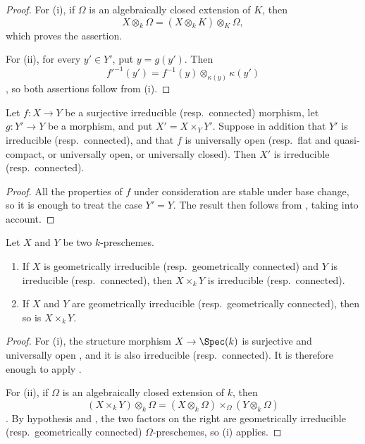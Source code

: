 \begin{proof}
For (i), if $\Omega$ is an algebraically closed extension of $K$, then
\[
X\otimes_k\Omega
  =(X\otimes_k K)\otimes_K\Omega,
\]
which proves the assertion.

For (ii), for every $y'\in Y'$, put $y=g(y')$.
Then
\[
f'^{-1}(y')
  =f^{-1}(y)\otimes_{\kappa(y)}\kappa(y')
\]
, so both assertions follow from (i).
\end{proof}

\begin{proposition}[4.5.7]
\label{IV.4.5.7}
Let $f:X\to Y$ be a surjective irreducible (resp.\ connected)
morphism, let $g:Y'\to Y$ be a morphism, and put
$X'=X\times_Y Y'$.
Suppose in addition that $Y'$ is irreducible (resp.\ connected), and
that $f$ is universally open (resp.\ flat and quasi-compact, or
universally open, or universally closed).
Then $X'$ is irreducible (resp.\ connected).
\end{proposition}

\begin{proof}
All the properties of $f$ under consideration are stable under base
change, so it is enough to treat the case $Y'=Y$.
The result then follows from , taking
 into account.
\end{proof}

\begin{corollary}[4.5.8]
\label{IV.4.5.8}
Let $X$ and $Y$ be two $k$-preschemes.
\begin{enumerate}
\item[\rm(i)]
\label{IV.4.5.8.i}
If $X$ is geometrically irreducible (resp.\ geometrically connected)
and $Y$ is irreducible (resp.\ connected), then $X\times_k Y$ is
irreducible (resp.\ connected).

\item[\rm(ii)]
\label{IV.4.5.8.ii}
If $X$ and $Y$ are geometrically irreducible
(resp.\ geometrically connected), then so is $X\times_k Y$.
\end{enumerate}
\end{corollary}

\begin{proof}
For (i), the structure morphism
$X\to\Spec(k)$ is surjective and universally open
, and it is also irreducible (resp.\ connected).
It is therefore enough to apply .

For (ii), if $\Omega$ is an algebraically closed extension of $k$, then
\[
(X\times_k Y)\otimes_k\Omega
  =(X\otimes_k\Omega)\times_\Omega(Y\otimes_k\Omega)
\]
.
By hypothesis and , the two factors on the right are
geometrically irreducible (resp.\ geometrically connected)
$\Omega$-preschemes, so (i) applies.
\end{proof}

